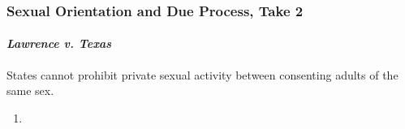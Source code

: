 \newpage %

\subsubsection{Sexual Orientation and Due Process, Take 2}

\paragraph{\emph{Lawrence v. Texas}}

States cannot prohibit private sexual activity between consenting adults of 
the same sex.

\begin{enumerate}
    \item %
\end{enumerate}
% 
% 
% 
% 
% 
% 
% 
% 
% 
